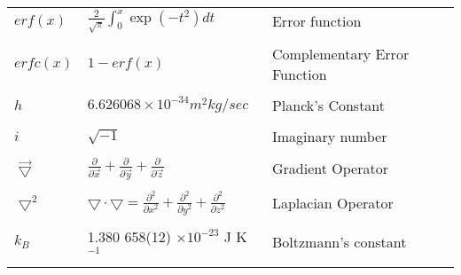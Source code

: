 \begin{tabular}{p{1.2in}p{2.5in}p{2.5in}}

$erf(x)$ & $\frac 2 {\sqrt{\pi}} \int_0^x \exp(-t^2) dt$ & Error function \\ \\

$erfc(x)$ & $1 - erf(x)$ & Complementary Error Function \\ \\

$h$ & $6.626068 \times 10 ^ {-34} m^2kg/sec$ & Planck's Constant \cite{CRC_Book}
\\ \\

$i$ & $\sqrt{-1}$ & Imaginary number \\ \\

$\vec{\bigtriangledown}$ & $\frac{\partial}{\partial \vec{x}} +
\frac{\partial}{\partial \vec{y}} + \frac {\partial}{\partial \vec{z}}$ &
Gradient Operator \\ \\

$\bigtriangledown^2$ & $\bigtriangledown \cdot \bigtriangledown = \frac
{\partial ^2} {\partial x ^2} + \frac {\partial ^2} {\partial y^2} + \frac
{\partial ^2} {\partial z ^2}$ & Laplacian Operator \\ \\

$k_B$ & 1.380 658(12) $\times 10 ^ {-23}$ J K$^{-1}$ &
Boltzmann's constant \cite{CRC_Book} \\ \\

\end{tabular}
